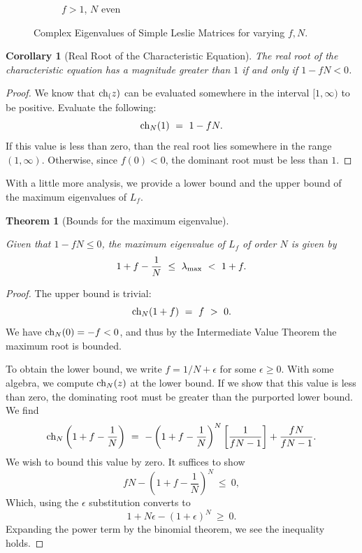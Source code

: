 \documentclass[11pt,reqno]{amsart}
\numberwithin{equation}{section}
\newtheorem{cor}[thm]{Corollary}
\theoremstyle{plain}
\newtheorem{theorem}[thm]{Theorem}
\newcommand{\ch}{\textnormal{ch}}
\begin{document}
\begin{figure}[htp]
\begin{subfigure}[b]{0.45\textwidth}
        \caption{$f > 1$, $N$ even}
        \label{fig:fig4}
    \end{subfigure}
    \caption{Complex Eigenvalues of Simple Leslie Matrices for varying $f, N$.}
    \label{fig:overall}
\end{figure}

\newpage

\begin{cor}[Real Root of the Characteristic Equation]

    The real root of the characteristic equation has a magnitude greater 
    than $1$ if and only if $1-fN < 0$. 
\end{cor}
\begin{proof}
    We know that $\ch_(z)$ can be evaluated somewhere in 
    the interval $[1, \infty)$ to be positive. 
    Evaluate the following:
    \begin{equation}
        \ch_N(1) \ =\  1 - fN. 
    \end{equation}
    If this value is less than zero, than the real 
    root lies somewhere in the range $(1, \infty)$. 
    Otherwise, since $f(0) < 0$, the dominant root 
    must be less than $1$. 
\end{proof}



With a little more analysis, we provide a lower bound and the 
upper bound of the maximum eigenvalues of $L_f$. 

\begin{theorem}[Bounds for the maximum eigenvalue]\label{thm:Bound}

 Given that $1-fN \leq 0$, the maximum eigenvalue of $L_f$ of order 
 $N$ is given by 
 \[
 1 + f - \frac 1 {N} \ \leq\ \lambda_{\rm max} \ < \ 1 + f.
 \]
\end{theorem}

\begin{proof}
    The upper bound is trivial:
    \[
        \ch_N(1+f) \ = \ f \ >\  0.
    \]  
    We have $\ch_N(0) = -f < 0$, and thus by the Intermediate Value Theorem the maximum root is 
    bounded. 

    To obtain the lower bound, we write $f = 1/N + \epsilon$ for 
    some $\epsilon \geq 0$. With some algebra, we compute $\ch_N(z)$ at the lower 
    bound. If we show that this value is less than zero, the 
    dominating root must be greater than the purported lower bound. We find
    \[
        \ch_N\left(
            1 + f - \frac 1 N
        \right)  \ = \ -
        \left(
            1 + f - \frac 1 N
        \right)^N \left[
            \frac {1} {fN - 1}
        \right]
        + \frac {fN} {fN - 1}.
    \]
    We wish to bound this value by zero. It suffices to show 
    \[
        fN - \left(
            1 + f - \frac 1 N
        \right)^N \ \leq\ 0,
    \]
    Which, using the $\epsilon$ substitution converts to 
    \[
        1 + N\epsilon - (1 + \epsilon)^N \ \geq \ 0.
    \]
    Expanding the power term by the binomial theorem, 
    we see the inequality holds. 
\end{proof}
\end{document}
